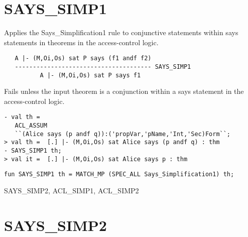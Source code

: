 \section{SAYS\_SIMP1}



\egroup

\SYNOPSIS
Applies the Says_Simplification1 rule to conjunctive statements within
says statements in theorems in the access-control logic.

\DESCRIBE
\begin{verbatim}
   A |- (M,Oi,Os) sat P says (f1 andf f2)
   -------------------------------------- SAYS_SIMP1
          A |- (M,Oi,Os) sat P says f1
\end{verbatim}

\FAILURE
Fails unless the input theorem is a conjunction within a
says statement in the access-control logic.

\EXAMPLE
\begin{holboxed}
\begin{verbatim}
- val th = 
   ACL_ASSUM 
   ``(Alice says (p andf q)):('propVar,'pName,'Int,'Sec)Form``;
> val th =  [.] |- (M,Oi,Os) sat Alice says (p andf q) : thm
- SAYS_SIMP1 th;
> val it =  [.] |- (M,Oi,Os) sat Alice says p : thm
\end{verbatim}
\end{holboxed}

\IMPLEMENTATION
\begin{holboxed}
\begin{verbatim}
fun SAYS_SIMP1 th = MATCH_MP (SPEC_ALL Says_Simplification1) th;
\end{verbatim}
\end{holboxed}

\SEEALSO
SAYS\_SIMP2, ACL\_SIMP1, ACL\_SIMP2
\ENDDOC

\section{SAYS\_SIMP2}

